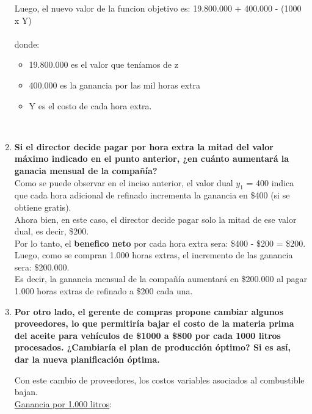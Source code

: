 \documentclass[10pt,a4paper]{article}
\begin{document}
\begin{enumerate}[label=\textbf{\sffamily\large\arabic*.}]
    \vspace{1em}
Luego, el nuevo valor de la funcion objetivo es: 19.800.000 + 400.000 - (1000 x Y)
\\
\\
donde:
\begin{itemize}
\item 19.800.000 es el valor que teníamos de z
\item 400.000 es la ganancia por las mil horas extra
\item Y es el costo de cada hora extra.
\end{itemize}
\\
\vspace{1em}
    \item {\bfseries\large Si el director decide pagar por hora extra la mitad del valor máximo indicado en el punto anterior, ¿en cuánto
    aumentará la ganacia mensual de la compañía?} \\

    Como se puede observar en el inciso anterior, el valor dual $y_{1}$ = 400 indica que cada hora adicional de refinado incrementa la ganancia en \$400 (si
    se obtiene gratis). \\

    Ahora bien, en este caso, el director decide pagar solo la mitad de ese valor dual, es decir, \$200.\\
    Por lo tanto, el \textbf{benefico neto} por cada hora extra sera: \$400 - \$200 = \$200. \\
    Luego, como se compran 1.000 horas extras, el incremento de las ganancia sera: \$200.000.\\

    Es decir, la ganancia mensual de la compañía aumentará en \$200.000 al pagar 1.000 horas extras de refinado a \$200 cada una.
\vspace{1em}
    \item {\bfseries\large Por otro lado, el gerente de compras propone cambiar algunos proveedores, lo que permitiría bajar el costo
    de la materia prima del aceite para vehículos de \$1000 a \$800 por cada 1000 litros procesados. ¿Cambiaría el
    plan de producción óptimo? Si es así, dar la nueva planificación óptima.}
    \vspace{1em}

    Con este cambio de proveedores, los costos variables asociados al combustible bajan. \\

    \underline{Ganancia por 1.000 litros}:


\end{enumerate}
\end{document}
